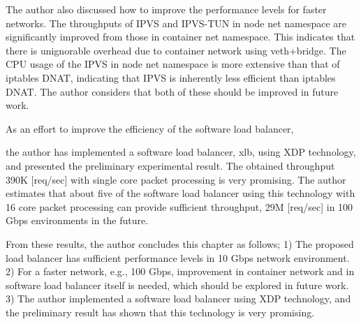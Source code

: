 The author also discussed how to improve the performance levels for faster networks.
The throughputs of IPVS and IPVS-TUN in node net namespace are significantly improved from those in container net namespace.
This indicates that there is unignorable overhead due to container network using veth+bridge.
The CPU usage of the IPVS in node net namespace is more extensive than that of iptables DNAT, indicating that IPVS is inherently less efficient than iptables DNAT.
The author considers that both of these should be improved in future work.



As an effort to improve the efficiency of the software load balancer, 

the author has implemented a software load balancer, xlb, using XDP technology, and presented the preliminary experimental result.
The obtained throughput 390K [req/sec] with single core packet processing is very promising.
The author estimates that about five of the software load balancer using this technology with 16 core packet processing can provide sufficient throughput, 29M [req/sec] in 100 Gbps environments in the future. 







From these results, the author concludes this chapter as follows;
1) The proposed load balancer has sufficient performance levels in 10 Gbps network environment.
2) For a faster network, e.g., 100 Gbps, improvement in container network and in software load balancer itself is needed, which should be explored in future work.
3) The author implemented a software load balancer using XDP technology, and the preliminary result has shown that this technology is very promising.

